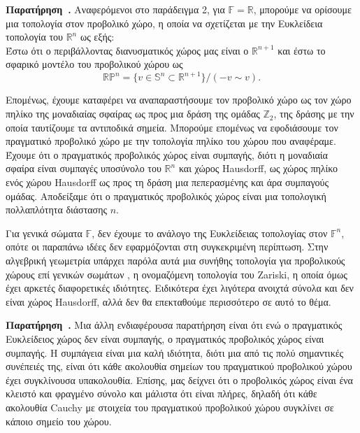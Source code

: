 \documentclass[12pt, a4paper]{book}
\newcounter{remark}[section]
\newenvironment{remark}[1][]{\refstepcounter{remark}\par\medskip
   \textbf{Παρατήρηση~\theremark. #1} \rmfamily}{\medskip}
\begin{document}
\begin{remark}
Αναφερόμενοι στο παράδειγμα 2, για $\mathbb{F} = \mathbb{R}$, μπορούμε να ορίσουμε μια τοπολογία στον προβολικό χώρο, η οποία να σχετίζεται με την Ευκλείδεια τοπολογία του $\mathbb{R} ^n$ ως εξής:\\ Έστω ότι ο περιβάλλοντας διανυσματικός χώρος μας είναι ο $\mathbb{R}^{n+1}$ και έστω το σφαρικό μοντέλο του προβολικού χώρου ως
\begin{displaymath}
\mathbb{R}\mathbb{P}^n  = \{ v \in \mathbb{S}^n  \subset \mathbb{R}^{n+1} \} \big/ (-v \sim v).
\end{displaymath}

Επομένως, έχουμε καταφέρει να αναπαραστήσουμε τον προβολικό χώρο ως τον χώρο πηλίκο της μοναδιαίας σφαίρας ως προς μια δράση της ομάδας $\mathbb{Z}_2$, της δράσης με την οποία ταυτίζουμε τα αντιποδικά σημεία. Μπορούμε επομένως να εφοδιάσουμε τον πραγματικό προβολικό χώρο με την τοπολογία πηλίκο του χώρου που αναφέραμε. Έχουμε ότι ο πραγματικός προβολικός χώρος είναι συμπαγής, διότι η μοναδιαία σφαίρα είναι συμπαγές υποσύνολο του $\mathbb{R} ^n$ και χώρος \foreignlanguage{english}{Hausdorff}, ως χώρος πηλίκο ενός χώρου \foreignlanguage{english}{Hausdorff} ως προς τη δράση μια πεπερασμένης και άρα συμπαγούς ομάδας. Αποδείξαμε ότι ο πραγματικός προβολικός χώρος είναι μια τοπολογική πολλαπλότητα διάστασης $n$. 

Για γενικά σώματα $\mathbb{F}$, δεν έχουμε το ανάλογο της Ευκλείδειας τοπολογίας στον $\mathbb{F}^n$, οπότε οι παραπάνω ιδέες δεν εφαρμόζονται στη συγκεκριμένη περίπτωση. Στην αλγεβρική γεωμετρία υπάρχει παρόλα αυτά μια συνήθης τοπολογία για προβολικούς χώρους επί γενικών σωμάτων , η ονομαζόμενη τοπολογία του \foreignlanguage{english}{Zariski}, η οποία όμως έχει αρκετές διαφορετικές ιδιότητες. Ειδικότερα έχει λιγότερα ανοιχτά σύνολα και δεν είναι χώρος \foreignlanguage{english}{Hausdorff}, αλλά δεν θα επεκταθούμε περισσότερο σε αυτό το θέμα.    
\end{remark}

\begin{remark}
Μια άλλη ενδιαφέρουσα παρατήρηση είναι ότι ενώ ο πραγματικός Ευκλείδειος χώρος δεν είναι συμπαγής, ο πραγματικός προβολικός χώρος είναι συμπαγής. Η συμπάγεια είναι μια καλή ιδιότητα, διότι μια από τις πολύ σημαντικές συνέπειές της, είναι ότι κάθε ακολουθία σημείων του πραγματικού προβολικού χώρου έχει συγκλίνουσα υπακολουθία.  Επίσης, μας δείχνει ότι ο προβολικός χώρος είναι ένα κλειστό και φραγμένο σύνολο και μάλιστα ότι είναι πλήρες, δηλαδή ότι κάθε ακολουθία \textlatin{Cauchy} με στοιχεία του πραγματικού προβολικού χώρου συγκλίνει σε κάποιο σημείο του χώρου.
\end{remark}
\end{document}

